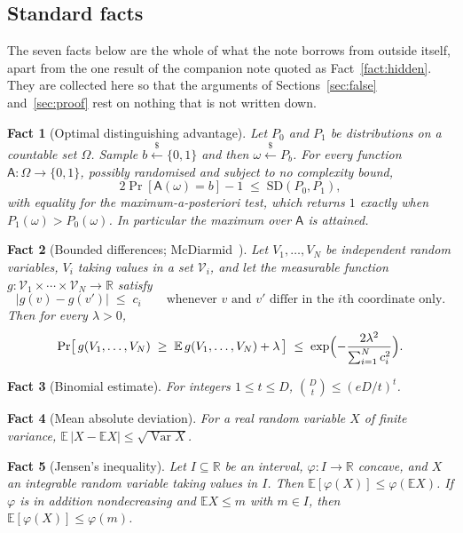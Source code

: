 \documentclass[11pt,a4paper]{article}
\theoremstyle{plain}
\newtheorem{fact}{Fact}
\theoremstyle{definition}
\theoremstyle{remark}
\newcommand{\sample}{\stackrel{{\scriptscriptstyle\$}}{\leftarrow}}
\newcommand{\SD}{\mathrm{SD}}
\begin{document}
\subsection{Standard facts}\label{sec:facts}

The seven facts below are the whole of what the note borrows from outside itself, apart from the
one result of the companion note quoted as Fact~\ref{fact:hidden}. They are collected here so
that the arguments of Sections~\ref{sec:false} and~\ref{sec:proof} rest on nothing that is not
written down.

\begin{fact}[Optimal distinguishing advantage]\label{fact:sd}
Let $P_0$ and $P_1$ be distributions on a countable set $\Omega$. Sample $b \sample \{0,1\}$ and
then $\omega \sample P_b$. For every function $\mathsf{A} \colon \Omega \to \{0,1\}$, possibly
randomised and subject to no complexity bound,
\[
  2\Pr[\mathsf{A}(\omega) = b] - 1 \;\le\; \SD(P_0,P_1) ,
\]
with equality for the maximum-a-posteriori test, which returns $1$ exactly when
$P_1(\omega) > P_0(\omega)$. In particular the maximum over $\mathsf{A}$ is attained.
\end{fact}

\begin{fact}[Bounded differences; McDiarmid~\cite{McD89}]\label{fact:mcd}
Let $V_1, \dots, V_N$ be independent random variables, $V_i$ taking values in a set
$\mathcal{V}_i$, and let the measurable function
$g \colon \mathcal{V}_1 \times \cdots \times \mathcal{V}_N \to \mathbb{R}$ satisfy
\[
  |g(v) - g(v')| \;\le\; c_i
  \qquad\text{whenever $v$ and $v'$ differ in the $i$th coordinate only.}
\]
Then for every $\lambda > 0$,
\[
  \Pr\bigl[\, g(V_1,\dots,V_N) \;\ge\; \mathbb{E}\,g(V_1,\dots,V_N) + \lambda \,\bigr]
  \;\le\; \exp\Bigl(-\frac{2\lambda^{2}}{\sum_{i=1}^{N} c_i^{2}}\Bigr) .
\]
\end{fact}

\begin{fact}[Binomial estimate]\label{fact:binom}
For integers $1 \le t \le D$, \; $\binom{D}{t} \le (eD/t)^{t}$.
\end{fact}

\begin{fact}[Mean absolute deviation]\label{fact:mad}
For a real random variable $X$ of finite variance,
$\mathbb{E}\,|X - \mathbb{E}X| \le \sqrt{\operatorname{Var} X}$.
\end{fact}

\begin{fact}[Jensen's inequality]\label{fact:jensen}
Let $I \subseteq \mathbb{R}$ be an interval, $\varphi \colon I \to \mathbb{R}$ concave, and $X$
an integrable random variable taking values in $I$. Then
$\mathbb{E}[\varphi(X)] \le \varphi(\mathbb{E}X)$. If $\varphi$ is in addition nondecreasing and
$\mathbb{E}X \le m$ with $m \in I$, then $\mathbb{E}[\varphi(X)] \le \varphi(m)$.
\end{fact}
\end{document}
